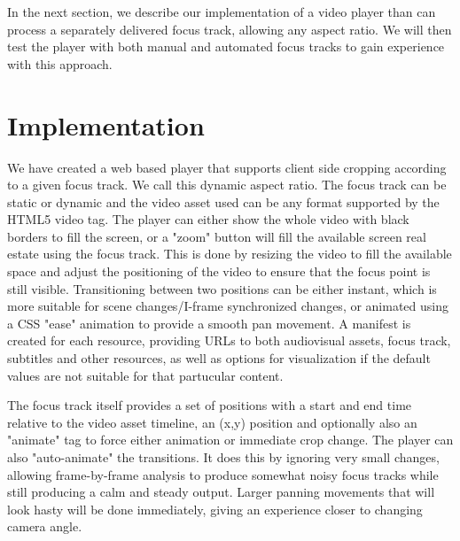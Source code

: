 \documentclass[sigconf, review=true]{acmart}
\begin{document}
In the next section, we describe our implementation of a video player than can
process a separately delivered focus track, allowing any aspect ratio. We
will then test the player with both manual and automated focus tracks to gain
experience with this approach.


\section{Implementation}

We have created a web based player that supports client side cropping
according to a given focus track. We call this dynamic aspect ratio. The
focus track can be static or dynamic and the video asset used can be any
format supported by the HTML5 video tag. The player can either show the whole
video with black borders to fill the screen, or a "zoom" button will fill the
available screen real estate using the focus track. This is done by resizing
the video to fill the available space and adjust the positioning of the video
to ensure that the focus point is still visible. Transitioning between two
positions can be either instant, which is more suitable for scene
changes/I-frame synchronized changes, or animated using a CSS "ease"
animation to provide a smooth pan movement. A manifest is created for each
resource, providing URLs to both audiovisual assets, focus track, subtitles
and other resources, as well as options for visualization if the default
values are not suitable for that partucular content.

The focus track itself provides a set of positions with a start and end time
relative to the video asset timeline, an (x,y) position and optionally also
an "animate" tag to force either animation or immediate crop change. The
player can also "auto-animate" the transitions. It does this by ignoring very
small changes, allowing frame-by-frame analysis to produce somewhat noisy
focus tracks while still producing a calm and steady output. Larger panning
movements that will look hasty will be done immediately, giving an experience
closer to changing camera angle.
\end{document}
